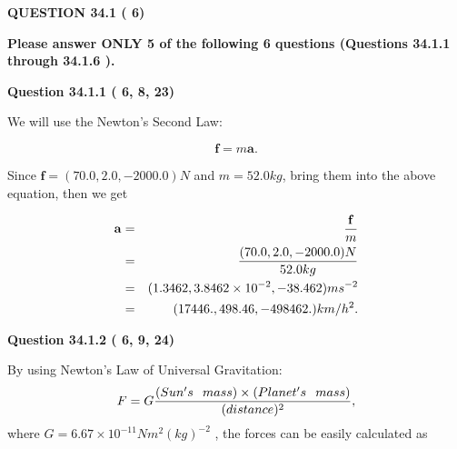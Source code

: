 \documentclass[12pt]{article}
\begin{document}
{\textbf{\Large{QUESTION
34.1 
 (          6)
}}}
  
  
{\textbf{\Large{Please answer ONLY  %
           5 %
 of the following  %
           6 %
 questions (Questions  %
34.1.1 %
 through  %
34.1.6 %
 ). }}}
   
   
  
\vspace{0.2in}
  
{\textbf{\Large{Question
34.1.1 
 (          6,          8,         23)
}}}
  
  
 
 

We will use the Newton's Second Law:
 
\[
\mathbf{f}=m\mathbf{a}.
\]
 
Since $\mathbf{f}=( %
70.0,  %
2.0,  %
-2000.0 )N$
and $m= %
52.0kg$, bring them into the above equation, then we get
 
\begin{eqnarray*}
\mathbf{a}&=&\frac{\mathbf{f}}m  \\
&=&\frac{(
70.0 ,
2.0 ,
-2000.0 )N
}{ %
52.0 kg}  \\
&=&(
1.3462 ,
3.8462 \times 10^{-2},
-38.462
)ms^{-2} \\
&=&(
17446. ,
498.46 ,
-498462.
)km/h^2.
\end{eqnarray*}
 
 
 
  
\vspace{0.2in}
  
{\textbf{\Large{Question
34.1.2 
 (          6,          9,         24)
}}}
  
  
 
 

By using Newton's Law of Universal Gravitation:
\[
F=G \frac{(Sun's \hspace{0.1in} mass) \times (Planet's \hspace{0.1in} mass)} { (distance)^2},
\]
where
$ G= %
6.67 \times 10^{-11}N m^{2}(kg)^{-2}$ , the forces can be easily calculated as
 
\vspace{0.2in}
 
\end{document}
